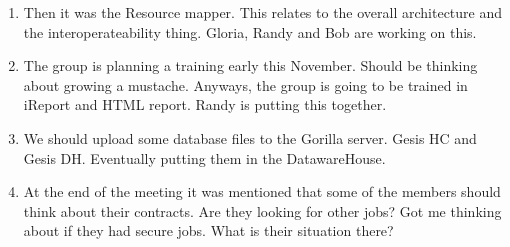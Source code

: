 \begin{enumerate}
\item Then it was the Resource mapper. This relates to the overall architecture and the interoperateability thing. Gloria, Randy and Bob are working on this. 
\item The group is planning a training early this November. Should be thinking about growing a mustache. Anyways, the group is going to be trained in iReport and HTML report. Randy is putting this together.
\item We should upload some database files to the Gorilla server. Gesis HC and Gesis DH. Eventually putting them in the DatawareHouse.
\item At the end of the meeting it was mentioned that some of the members should think about their contracts. Are they looking for other jobs? Got me thinking about if they had secure jobs. What is their situation there?
\end{enumerate}

